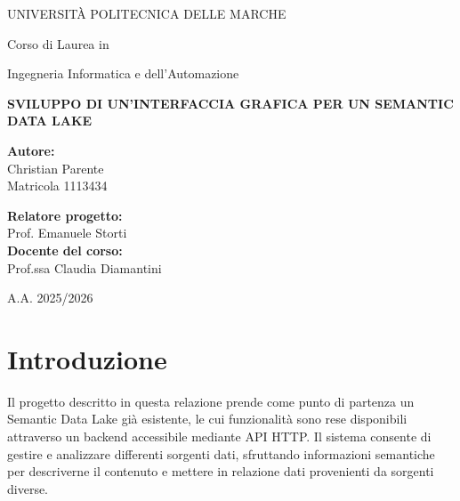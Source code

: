 \documentclass[13.6pt,a4paper]{report}
\begin{document}
\begin{titlepage}
    \centering

    {\Large UNIVERSITÀ POLITECNICA DELLE MARCHE\par}
    \vspace{0.3cm}

    {\large Corso di Laurea in\par}
    {\large Ingegneria Informatica e dell'Automazione\par}

    \vspace{1cm}
    
    

    \vspace{1.6cm}

    {\LARGE\bfseries
    SVILUPPO DI UN'INTERFACCIA GRAFICA PER UN SEMANTIC DATA LAKE
    \par}

    \vfill

    \begin{minipage}[t]{0.45\textwidth}
        \raggedright
        \Large
        \textbf{Autore:}\\
        Christian Parente\\
        Matricola 1113434
    \end{minipage}
    \hfill
    \begin{minipage}[t]{0.45\textwidth}
        \raggedleft
        \Large
        \textbf{Relatore progetto:}\\
        Prof. Emanuele Storti\\[0.5cm]

        \textbf{Docente del corso:}\\
        \Large
        Prof.ssa Claudia Diamantini
    \end{minipage}

    \vspace{3cm}

    {\large A.A. 2025/2026}

\end{titlepage}

\tableofcontents

\chapter{Introduzione}

Il progetto descritto in questa relazione prende come punto di partenza un Semantic Data Lake già esistente, le cui funzionalità sono rese disponibili attraverso un backend accessibile mediante API HTTP. Il sistema consente di gestire e analizzare differenti sorgenti dati, sfruttando informazioni semantiche per descriverne il contenuto e mettere in relazione dati provenienti da sorgenti diverse.
\end{document}
